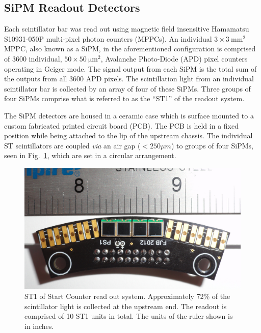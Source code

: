 \subsection{SiPM Readout Detectors} \label{sec:design_sipms}

Each scintillator bar was read out using magnetic field insensitive Hamamatsu S10931-050P multi-pixel photon counters (MPPCs)\cite{hamamatsu}.  An individual $\mathrm{3 \times 3\ mm^2}$ MPPC, also known as a SiPM, in the aforementioned configuration is comprised of 3600 individual, $\mathrm{50 \times 50\ \mu m^2}$, Avalanche Photo-Diode (APD) pixel counters operating in Geiger mode. The signal output from each SiPM is the total sum of the outputs from all 3600 APD pixels\cite{sipm_spec}.  The scintillation light from an individual scintillator bar is collected by an array of four of these SiPMs.  Three groups of four SiPMs comprise what is referred to as the ``ST1'' of the readout system.

The SiPM detectors are housed in a ceramic case which is surface mounted to a custom fabricated printed circuit board (PCB).  The PCB is held in a fixed position while being attached to the lip of the upstream chassis.  The individual ST scintillators are coupled \emph{via} an air gap ($< 250 \mu m$) to groups of four SiPMs, seen in Fig.~\ref{fig:st1_mounted}, which are set in a circular arrangement.
	\begin{figure}[!htb]
		\centering
		\includegraphics[width=1.0\columnwidth]{design/figs/st1_ruler}
		\caption{ST1 of Start Counter read out system. Approximately 72\% of the scintillator light is collected at the upstream end.  The readout is comprised of 10 ST1 units in total.  The units of the ruler shown is in inches.}
		\label{fig:st1_mounted}
	\end{figure}

